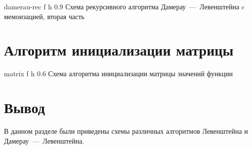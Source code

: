 {damerau-rec} %
{f} %
{h} %
{0.9\textwidth} %
{Схема рекурсивного алгоритма Дамерау~---~Левенштейна c мемоизацией, вторая часть} %

\clearpage

\section{Алгоритм инициализации матрицы}

{matrix} %
{f} %
{h} %
{0.6\textwidth} %
{Схема алгоритма инициализации матрицы значений функции} %


\section*{Вывод}

В данном разделе были приведены схемы различных алгоритмов Левенштейна и Дамерау~---~Левенштейна.


